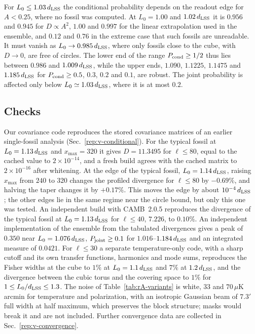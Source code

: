 For $L_0\leq1.03\,d_{\mathrm{LSS}}$ the conditional probability depends on the readout edge for $A<0.25$, where no fossil was computed.
At $L_0=1.00$ and $1.02\,d_{\mathrm{LSS}}$ it is $0.956$ and $0.945$ for $D\propto A^2$, $1.00$ and $0.997$ for the linear extrapolation used in the ensemble, and $0.12$ and $0.76$ in the extreme case that such fossils are unreadable. %
It must vanish as $L_0\to0.985\,d_{\mathrm{LSS}}$, where only fossils close to the cube, with $D\to0$, are free of circles.
The lower end of the range $P_{\rm cond}\geq1/2$ thus lies between $0.986$ and $1.009\,d_{\mathrm{LSS}}$, while the upper ends, $1.090$, $1.1225$, $1.1475$ and $1.185\,d_{\mathrm{LSS}}$ for $P_{\rm cond}\geq0.5$, $0.3$, $0.2$ and $0.1$, are robust. %
The joint probability is affected only below $L_0\simeq1.03\,d_{\mathrm{LSS}}$, where it is at most $0.2$. %

\subsection{Checks}
\label{rA:c-checks}

Our covariance code reproduces the stored covariance matrices of an earlier single-fossil analysis (Sec.~\ref{rep:v-conditional}).
For the typical fossil at $L_0=1.13\,d_{\mathrm{LSS}}$ and $x_{\max}=320$ it gives $D=11.3495$ for $\ell\leq80$, equal to the cached value to $2\times10^{-14}$, and a fresh build agrees with the cached matrix to $2\times10^{-16}$ after whitening. %
At the edge of the typical fossil, $L_0=1.14\,d_{\mathrm{LSS}}$, raising $x_{\max}$ from $240$ to $320$ changes the profiled divergence for $\ell\leq80$ by $-0.69\%$, and halving the taper changes it by $+0.17\%$. %
This moves the edge by about $10^{-4}\,d_{\mathrm{LSS}}$; the other edges lie in the same regime near the circle bound, but only this one was tested. %
An independent build with CAMB~2.0.5 reproduces the divergence of the typical fossil at $L_0=1.13\,d_{\mathrm{LSS}}$ for $\ell\leq40$, $7.226$, to $0.10\%$. %
An independent implementation of the ensemble from the tabulated divergences gives a peak of $0.350$ near $L_0=1.076\,d_{\mathrm{LSS}}$, $P_{\rm joint}\geq0.1$ for $1.016$--$1.184\,d_{\mathrm{LSS}}$ and an integrated measure of $0.0421$. %
For $\ell\leq30$ a separate temperature-only code, with a sharp cutoff and its own transfer functions, harmonics and mode sums, reproduces the Fisher widths at the cube to $1\%$ at $L_0=1.1\,d_{\mathrm{LSS}}$ and $7\%$ at $1.2\,d_{\mathrm{LSS}}$, and the divergence between the cubic torus and the covering space to $1\%$ for $1\leq L_0/d_{\mathrm{LSS}}\leq1.3$. %
The noise of Table~\ref{tab:rA-variants} is white, $33$ and $70\,\mu$K\,arcmin for temperature and polarization, with an isotropic Gaussian beam of $7.3'$ full width at half maximum, which preserves the block structure; masks would break it and are not included. %
Further convergence data are collected in Sec.~\ref{rep:v-convergence}.

